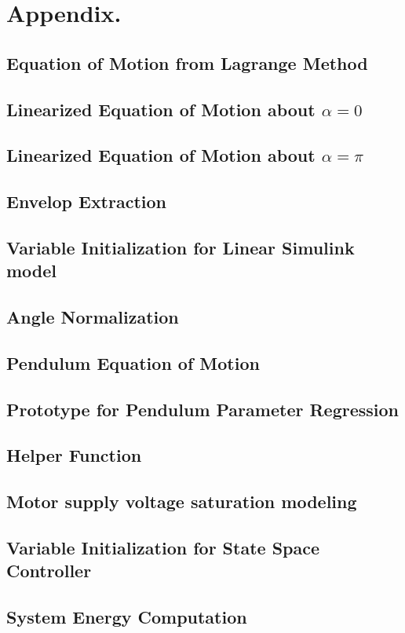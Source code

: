 \documentclass{article}
\theoremstyle{plain}
\theoremstyle{definition}
\theoremstyle{remark}
\begin{document}
\clearpage
\section*{Appendix.}

\subsection*{Equation of Motion from Lagrange Method}


\subsection*{Linearized Equation of Motion about $\alpha = 0$}


\subsection*{Linearized Equation of Motion about $\alpha = \pi$}


\subsection*{Envelop Extraction}


\subsection*{Variable Initialization for Linear Simulink model}


\subsection*{Angle Normalization}


\subsection*{Pendulum Equation of Motion}


\subsection*{Prototype for Pendulum Parameter Regression}


\subsection*{Helper Function}


\subsection*{Motor supply voltage saturation modeling}


\subsection*{Variable Initialization for State Space Controller}


\subsection*{System Energy Computation}

\end{document}
